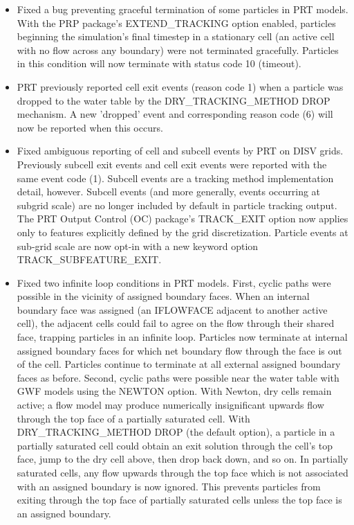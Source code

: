 \begin{itemize}
\item Fixed a bug preventing graceful termination of some particles in PRT models. With the PRP package's EXTEND\_TRACKING option enabled, particles beginning the simulation's final timestep in a stationary cell (an active cell with no flow across any boundary) were not terminated gracefully. Particles in this condition will now terminate with status code 10 (timeout).
\item PRT previously reported cell exit events (reason code 1) when a particle was dropped to the water table by the DRY\_TRACKING\_METHOD DROP mechanism. A new 'dropped' event and corresponding reason code (6) will now be reported when this occurs.
\item Fixed ambiguous reporting of cell and subcell events by PRT on DISV grids. Previously subcell exit events and cell exit events were reported with the same event code (1). Subcell events are a tracking method implementation detail, however. Subcell events (and more generally, events occurring at subgrid scale) are no longer included by default in particle tracking output. The PRT Output Control (OC) package's TRACK\_EXIT option now applies only to features explicitly defined by the grid discretization. Particle events at sub-grid scale are now opt-in with a new keyword option TRACK\_SUBFEATURE\_EXIT.
\item Fixed two infinite loop conditions in PRT models. First, cyclic paths were possible in the vicinity of assigned boundary faces. When an internal boundary face was assigned (an IFLOWFACE adjacent to another active cell), the adjacent cells could fail to agree on the flow through their shared face, trapping particles in an infinite loop. Particles now terminate at internal assigned boundary faces for which net boundary flow through the face is out of the cell. Particles continue to terminate at all external assigned boundary faces as before. Second, cyclic paths were possible near the water table with GWF models using the NEWTON option. With Newton, dry cells remain active; a flow model may produce numerically insignificant upwards flow through the top face of a partially saturated cell. With DRY\_TRACKING\_METHOD DROP (the default option), a particle in a partially saturated cell could obtain an exit solution through the cell's top face, jump to the dry cell above, then drop back down, and so on. In partially saturated cells, any flow upwards through the top face which is not associated with an assigned boundary is now ignored. This prevents particles from exiting through the top face of partially saturated cells unless the top face is an assigned boundary.
\end{itemize}
